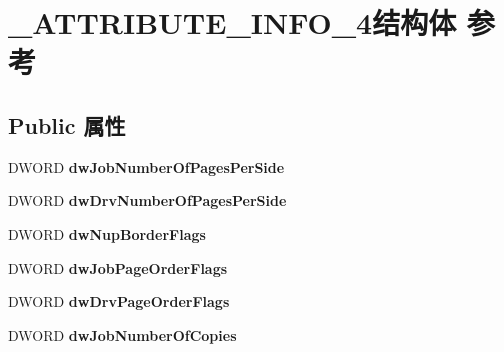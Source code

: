 \hypertarget{struct___a_t_t_r_i_b_u_t_e___i_n_f_o__4}{}\section{\+\_\+\+A\+T\+T\+R\+I\+B\+U\+T\+E\+\_\+\+I\+N\+F\+O\+\_\+4结构体 参考}
\label{struct___a_t_t_r_i_b_u_t_e___i_n_f_o__4}
\subsection*{Public 属性}
\begin{DoxyCompactItemize}
\item 
\mbox{\label{struct___a_t_t_r_i_b_u_t_e___i_n_f_o__4_a1d591703fbd47d6dbc5fbf4d2f498f73}} 
D\+W\+O\+RD {\bfseries dw\+Job\+Number\+Of\+Pages\+Per\+Side}
\item 
\mbox{\label{struct___a_t_t_r_i_b_u_t_e___i_n_f_o__4_a185c64231f20a58ef260c8c99b9403f3}} 
D\+W\+O\+RD {\bfseries dw\+Drv\+Number\+Of\+Pages\+Per\+Side}
\item 
\mbox{\label{struct___a_t_t_r_i_b_u_t_e___i_n_f_o__4_a9da45d62cda8c34b2011cd0fb8e4d70a}} 
D\+W\+O\+RD {\bfseries dw\+Nup\+Border\+Flags}
\item 
\mbox{\label{struct___a_t_t_r_i_b_u_t_e___i_n_f_o__4_a18bec5368070815a777e77201a67a583}} 
D\+W\+O\+RD {\bfseries dw\+Job\+Page\+Order\+Flags}
\item 
\mbox{\label{struct___a_t_t_r_i_b_u_t_e___i_n_f_o__4_abd5a7046f12af6e121534db959a188ed}} 
D\+W\+O\+RD {\bfseries dw\+Drv\+Page\+Order\+Flags}
\item 
\mbox{\label{struct___a_t_t_r_i_b_u_t_e___i_n_f_o__4_a2f5c2be094584a90fd9407ec5fb83329}} 
D\+W\+O\+RD {\bfseries dw\+Job\+Number\+Of\+Copies}
\item 
\mbox{\label{struct___a_t_t_r_i_b_u_t_e___i_n_f_o__4_a752d4c1c95d03e52dcc4a6fe11dd9e86}} 

\end{DoxyCompactItemize}
